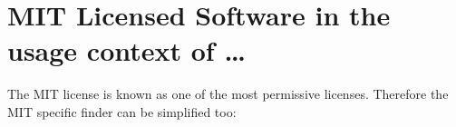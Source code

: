 %
%
%
%
%



\section{MIT Licensed Software in the usage context of \ldots}

The MIT license is known as one of the most permissive licenses. Therefore the
MIT specific finder can be simplified too:

